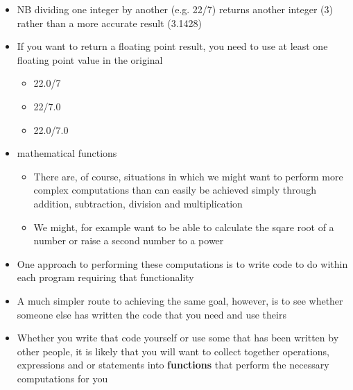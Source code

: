 \documentclass{beamer}
\begin{document}
\begin{frame}
\begin{itemize}
\item NB dividing one integer by another (e.g. 22/7) returns another integer (3) rather than a more accurate result (3.1428)

\item If you want to return a floating point result, you need to use at least one floating point value in the original

\begin{itemize}
\item 22.0/7
\item 22/7.0
\item 22.0/7.0 
\end{itemize}
\end{itemize}
\end{frame}

\begin{frame}
\begin{itemize}
\item mathematical functions

\begin{itemize}
\item There are, of course, situations in which we might want to perform more complex computations than can easily be achieved simply through addition, subtraction, division and multiplication
\item We might, for example want to be able to calculate the sqare root of a number or raise a second number to a power 
\end{itemize}
\end{itemize}
\end{frame}

\begin{frame}
\begin{itemize}
\item One approach to performing these computations is to write code to do within each program requiring that functionality
\item A much simpler route to achieving the same goal, however, is to see whether someone else has written the code that you need and use theirs
\item Whether you write that code yourself or use some that has been written by other people, it is likely that you will want to collect together operations, expressions and or statements into \textbf{functions} that perform the necessary computations for you
\end{itemize}
\end{frame}
\end{document}

